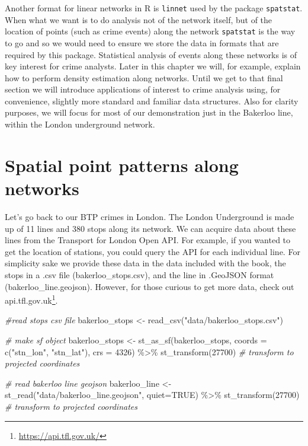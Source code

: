 \documentclass[
  krantz2]{krantz}
\makeatletter
\newenvironment{Shaded}{\begin{snugshade}}{\end{snugshade}}
\newcommand{\AttributeTok}[1]{\textcolor[rgb]{0.61,0.61,0.61}{#1}}
\newcommand{\CommentTok}[1]{\textcolor[rgb]{0.37,0.37,0.37}{\textit{#1}}}
\newcommand{\ConstantTok}[1]{\textcolor[rgb]{0,0,0}{#1}}
\newcommand{\DecValTok}[1]{\textcolor[rgb]{0.06,0.06,0.06}{#1}}
\newcommand{\FunctionTok}[1]{\textcolor[rgb]{0,0,0}{#1}}
\newcommand{\NormalTok}[1]{#1}
\newcommand{\OtherTok}[1]{\textcolor[rgb]{0.37,0.37,0.37}{#1}}
\newcommand{\SpecialCharTok}[1]{\textcolor[rgb]{0,0,0}{#1}}
\newcommand{\StringTok}[1]{\textcolor[rgb]{0.5,0.5,0.5}{#1}}
\renewcommand{\href}[2]{#2\footnote{\url{#1}}}
\newenvironment{kframe}{%
\medskip{}
\setlength{\fboxsep}{.8em}
 \def\at@end@of@kframe{}%
 \ifinner\ifhmode%
  \def\at@end@of@kframe{\end{minipage}}%
  \begin{minipage}{\columnwidth}%
 \fi\fi%
 \def\FrameCommand##1{\hskip\@totalleftmargin \hskip-\fboxsep
 \colorbox{shadecolor}{##1}\hskip-\fboxsep
     \hskip-\linewidth \hskip-\@totalleftmargin \hskip\columnwidth}%
 \MakeFramed {\advance\hsize-\width
   \@totalleftmargin\z@ \linewidth\hsize
   \@setminipage}}%
 {\par\unskip\endMakeFramed%
 \at@end@of@kframe}
\renewenvironment{Shaded}{\begin{kframe}}{\end{kframe}}
\makeatother
\begin{document}
Another format for linear networks in R is \texttt{linnet} used by the package \texttt{spatstat}. When what we want is to do analysis not of the network itself, but of the location of points (such as crime events) along the network \texttt{spatstat} is the way to go and so we would need to ensure we store the data in formats that are required by this package. Statistical analysis of events along these networks is of key interest for crime analysts. Later in this chapter we will, for example, explain how to perform density estimation along networks. Until we get to that final section we will introduce applications of interest to crime analysis using, for convenience, slightly more standard and familiar data structures. Also for clarity purposes, we will focus for most of our demonstration just in the Bakerloo line, within the London underground network.

\hypertarget{spatial-point-patterns-along-networks}{%
\section{Spatial point patterns along networks}\label{spatial-point-patterns-along-networks}}

Let's go back to our BTP crimes in London. The London Underground is made up of 11 lines and 380 stops along its network. We can acquire data about these lines from the Transport for London Open API. For example, if you wanted to get the location of stations, you could query the API for each individual line. For simplicity sake we provide these data in the data included with the book, the stops in a .csv file (bakerloo\_stops.csv), and the line in .GeoJSON format (bakerloo\_line.geojson). However, for those curious to get more data, check out \href{https://api.tfl.gov.uk/}{api.tfl.gov.uk}.

\begin{Shaded}
\begin{Highlighting}[]
\CommentTok{\#read stops csv file}
\NormalTok{bakerloo\_stops }\OtherTok{\textless{}{-}} \FunctionTok{read\_csv}\NormalTok{(}\StringTok{"data/bakerloo\_stops.csv"}\NormalTok{)}

\CommentTok{\# make sf object}
\NormalTok{bakerloo\_stops }\OtherTok{\textless{}{-}} \FunctionTok{st\_as\_sf}\NormalTok{(bakerloo\_stops, }
                           \AttributeTok{coords =} \FunctionTok{c}\NormalTok{(}\StringTok{"stn\_lon"}\NormalTok{, }\StringTok{"stn\_lat"}\NormalTok{), }
                           \AttributeTok{crs =} \DecValTok{4326}\NormalTok{) }\SpecialCharTok{\%\textgreater{}\%} 
  \FunctionTok{st\_transform}\NormalTok{(}\DecValTok{27700}\NormalTok{) }\CommentTok{\# transform to projected coordinates}

\CommentTok{\# read bakerloo line geojson}
\NormalTok{bakerloo\_line }\OtherTok{\textless{}{-}} \FunctionTok{st\_read}\NormalTok{(}\StringTok{"data/bakerloo\_line.geojson"}\NormalTok{, }
                         \AttributeTok{quiet=}\ConstantTok{TRUE}\NormalTok{) }\SpecialCharTok{\%\textgreater{}\%} 
  \FunctionTok{st\_transform}\NormalTok{(}\DecValTok{27700}\NormalTok{) }\CommentTok{\# transform to projected coordinates}
\end{Highlighting}
\end{Shaded}
\end{document}
